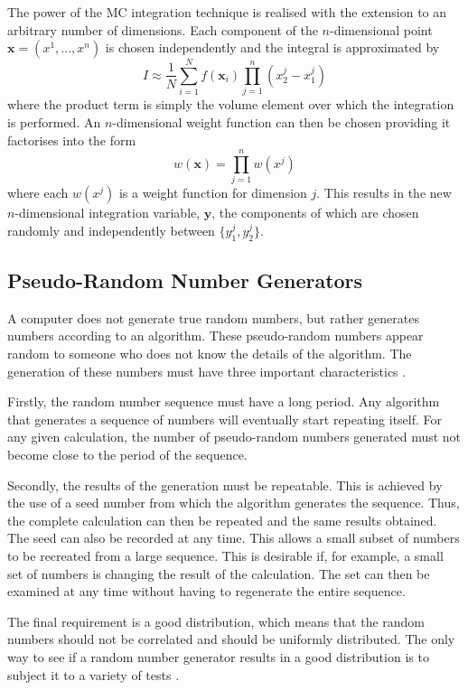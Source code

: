 The power of the MC integration technique is realised with the extension to an arbitrary number of dimensions. Each component of the $n$-dimensional point $\textbf{x}=(x^1,...,x^n)$ is chosen independently and the integral is approximated by
\begin{equation}
I \approx \frac{1}{N}\sum_{i=1}^{N} f(\textbf{x}_i) \prod_{j=1}^{n}\left( x^j_{2} -x^{j}_{1}\right) 
\end{equation}
where the product term is simply the volume element over which the integration is performed. An $n$-dimensional  weight function can then be chosen providing it factorises into the form
\begin{equation}
w(\textbf{x}) = \prod_{j=1}^{n} w(x^j) 
\end{equation}
where each $w(x^j)$ is a weight function for dimension $j$. This results in the new $n$-dimensional integration variable, $\textbf{y}$, the components of which are chosen randomly and  independently between $\{y^j_{1}, y^j_{2}\}$.


\subsection{Pseudo-Random Number Generators}

A computer does not generate true random numbers, but rather generates numbers according to an algorithm. These pseudo-random numbers appear random to someone who does not know the details of the algorithm. The generation of these numbers must have three important characteristics \cite{James:1988vf}. 

Firstly, the random number sequence must have a long period. Any algorithm that generates a sequence of numbers will eventually start repeating itself. For any given calculation, the number of pseudo-random numbers generated must not become close to the period of the sequence.

Secondly, the results of the generation must be repeatable. This is achieved by the use of a seed number from which the algorithm generates the sequence. Thus, the complete calculation can then be repeated and the same results obtained. The seed can also be recorded at any time. This allows a small subset of numbers to be recreated from a large sequence. This is desirable if, for example, a small set of numbers is changing the result of the calculation. The set can then be examined at any time without having to regenerate the  entire sequence.

The final requirement is a good distribution, which means that the random numbers should not be correlated and should be uniformly distributed. The only way to see if a random number generator results in a good distribution is to subject it to a variety of tests \cite{Vattulainen:1993rm,Rutti:2004th}. 

